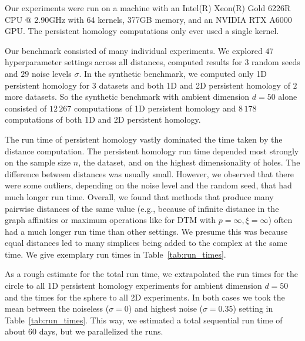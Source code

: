 \documentclass{article}
\theoremstyle{plain}
\theoremstyle{definition}
\theoremstyle{remark}
\begin{document}
Our experiments were run on a machine with an Intel(R) Xeon(R) Gold 6226R CPU @ 2.90GHz with 64 kernels, 377GB memory, and an NVIDIA RTX A6000 GPU. The persistent homology computations only ever used a single kernel.

Our benchmark consisted of many individual experiments. We explored $47$ hyperparameter settings across all distances, computed results for $3$ random seeds and $29$ noise levels $\sigma$. In the synthetic benchmark, we computed only 1D persistent homology for $3$ datasets and both 1D and 2D persistent homology of $2$ more datasets. So the synthetic benchmark with ambient dimension $d=50$ alone consisted of $12\,267$ computations of 1D persistent homology and $8\, 178$ computations of both 1D and 2D persistent homology. 

The run time of persistent homology vastly dominated the time taken by the distance computation. The persistent homology run time depended most strongly on the sample size $n$, the dataset, and on the highest dimensionality of holes. The difference between distances was usually small. However, we observed that there were some outliers, depending on the noise level and the random seed, that had much longer run time. Overall, we found that methods that produce many pairwise distances of the same value (e.g., because of infinite distance in the graph affinities or maximum operations like for DTM with $p=\infty, \xi=\infty$) often had a much longer run time than other settings. We presume this was because equal distances led to many simplices being added to the complex at the same time. We give exemplary run times in Table~\ref{tab:run_times}. 

As a rough estimate for the total run time, we extrapolated the run times for the circle to all 1D persistent homology experiments for ambient dimension $d=50$ and the times for the sphere to all 2D experiments. In both cases we took the mean between the noiseless ($\sigma=0$) and highest noise ($\sigma=0.35$) setting in Table~\ref{tab:run_times}. This way, we estimated a total sequential run time of about $60$ days, but we parallelized the runs.
\end{document}
